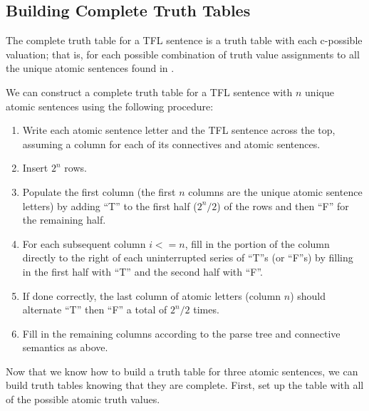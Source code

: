 \subsection{Building Complete Truth Tables}

\begin{definition}
  The complete truth table for a TFL sentence \ephi is a truth table with each
  c-possible valuation; that is, for each possible combination of truth value
  assignments to all the unique atomic sentences found in \ephi.

  We can construct a complete truth table for a TFL sentence with $n$ unique
  atomic sentences using the following procedure:
  
  \begin{enumerate}
  \item Write each atomic sentence letter and the TFL sentence across the top,
    assuming a column for each of its connectives and atomic sentences.
  \item Insert $2^n$ rows.
  \item Populate the first column (the first $n$ columns are the unique atomic
    sentence letters) by adding ``T'' to the first half ($2^n/2$) of the rows
    and then ``F'' for the remaining half.
  \item For each subsequent column $i<=n$, fill in the portion of the column
    directly to the right of each uninterrupted series of ``T''s (or ``F''s) by
    filling in the first half with ``T'' and the second half with ``F''.
  \item If done correctly, the last column of atomic letters (column $n$) should
    alternate ``T'' then ``F'' a total of $2^n/2$ times.
  \item Fill in the remaining columns according to the parse tree and connective
    semantics as above.
  \end{enumerate}

\end{definition}

Now that we know how to build a truth table for three atomic sentences, we can
build truth tables knowing that they are complete. First, set up the table with
all of the possible atomic truth values.

